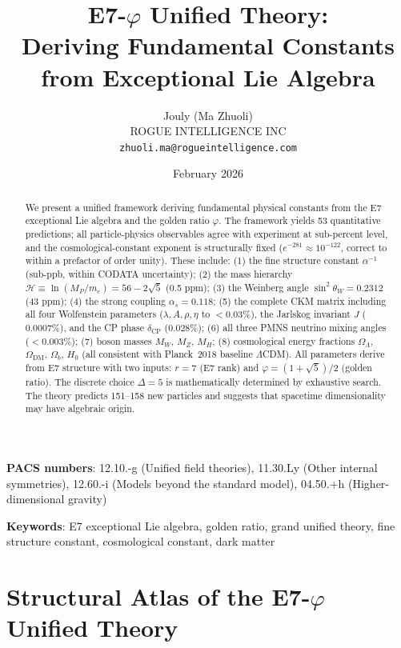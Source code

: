 \documentclass[11pt,a4paper]{article}
\title{E7-$\varphi$ Unified Theory:\\
Deriving Fundamental Constants from Exceptional Lie Algebra}
\author{Jouly (Ma Zhuoli)\\
\small ROGUE INTELLIGENCE INC\\
\small \texttt{zhuoli.ma@rogueintelligence.com}}
\date{February 2026}
\begin{document}
\maketitle

\begin{abstract}
We present a unified framework deriving fundamental physical constants from the E7 exceptional Lie algebra and the golden ratio $\varphi$. The framework yields 53 quantitative predictions; all particle-physics observables agree with experiment at sub-percent level, and the cosmological-constant exponent is structurally fixed ($e^{-281} \approx 10^{-122}$, correct to within a prefactor of order unity). These include: (1) the fine structure constant $\alpha^{-1}$ (sub-ppb, within CODATA uncertainty); (2) the mass hierarchy $\mathcal{H} \equiv \ln(M_P/m_e) = 56 - 2\sqrt{5}$ (0.5 ppm); (3) the Weinberg angle $\sin^2\theta_W = 0.2312$ (43 ppm); (4) the strong coupling $\alpha_s = 0.118$; (5) the complete CKM matrix including all four Wolfenstein parameters ($\lambda, A, \rho, \eta$ to $< 0.03\%$), the Jarlskog invariant $J$ ($0.0007\%$), and the CP phase $\delta_{\text{CP}}$ ($0.028\%$); (6) all three PMNS neutrino mixing angles ($< 0.003\%$); (7) boson masses $M_W$, $M_Z$, $M_H$; (8) cosmological energy fractions $\Omega_\Lambda$, $\Omega_{\text{DM}}$, $\Omega_b$, $H_0$ (all consistent with Planck~2018 baseline $\Lambda$CDM). All parameters derive from E7 structure with two inputs: $r = 7$ (E7 rank) and $\varphi = (1+\sqrt{5})/2$ (golden ratio). The discrete choice $\Delta = 5$ is mathematically determined by exhaustive search. The theory predicts 151--158 new particles and suggests that spacetime dimensionality may have algebraic origin.
\end{abstract}

\noindent\textbf{PACS numbers}: 12.10.-g (Unified field theories), 11.30.Ly (Other internal symmetries), 12.60.-i (Models beyond the standard model), 04.50.+h (Higher-dimensional gravity)

\noindent\textbf{Keywords}: E7 exceptional Lie algebra, golden ratio, grand unified theory, fine structure constant, cosmological constant, dark matter

\tableofcontents
\newpage

\section*{Structural Atlas of the E7-$\varphi$ Unified Theory}
\end{document}
